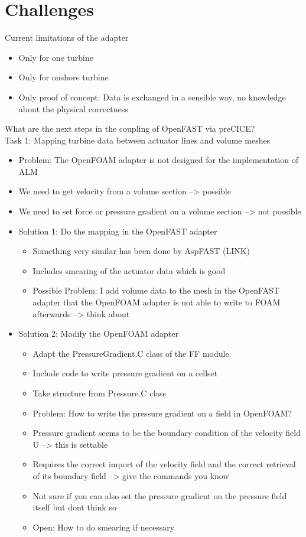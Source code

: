 \section{Challenges}

Current limitations of the adapter
\begin{itemize}
	\item Only for one turbine
	\item Only for onshore turbine
	\item Only proof of concept: Data is exchanged in a sensible way, no knowledge about the physical correctness\\
\end{itemize}

What are the next steps in the coupling of OpenFAST via preCICE?\\

Task 1: Mapping turbine data between actuator lines and volume meshes
\begin{itemize}
	\item Problem: The OpenFOAM adapter is not designed for the implementation of ALM
	\item We need to get velocity from a volume section --> possible
	\item We need to set force or pressure gradient on a volume section --> not possible
	\item Solution 1: Do the mapping in the OpenFAST adapter
	\begin{itemize}
		\item Something very similar has been done by AspFAST (LINK)
		\item Includes smearing of the actuator data which is good
		\item Possible Problem: I add volume data to the mesh in the OpenFAST adapter that the OpenFOAM adapter is not able to write to FOAM afterwards --> think about
	\end{itemize}
	\item Solution 2: Modify the OpenFOAM adapter
		\begin{itemize}
			\item Adapt the PressureGradient.C class of the FF module
			\item Include code to write pressure gradient on a cellset
			\item Take structure from Pressure.C class
			\item Problem: How to write the pressure gradient on a field in OpenFOAM?
			\item Pressure gradient seems to be the boundary condition of the velocity field U --> this is settable
			\item Requires the correct import of the velocity field and the correct retrieval of its boundary field --> give the commands you know
			\item Not sure if you can also set the pressure gradient on the pressure field itself but dont think so
			\item Open: How to do smearing if necessary\\
		\end{itemize}
\end{itemize}

